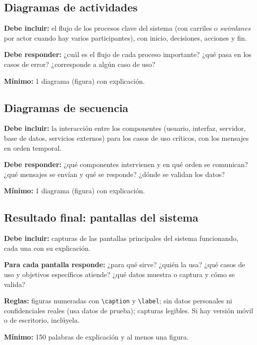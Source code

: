 

\subsection{Diagramas de actividades} \label{sec:diagramas_actividades} %

\begin{guia}
\textbf{Debe incluir:} el flujo de los procesos clave del sistema (con carriles o \emph{swimlanes} por actor cuando hay
varios participantes), con inicio, decisiones, acciones y fin.

\textbf{Debe responder:} ¿cuál es el flujo de cada proceso importante? ¿qué pasa en los casos de error? ¿corresponde a
algún caso de uso?

\textbf{Mínimo:} 1 diagrama (figura) con explicación.
\end{guia}



\subsection{Diagramas de secuencia} \label{sec:diagramas_secuencia} %

\begin{guia}
\textbf{Debe incluir:} la interacción entre los componentes (usuario, interfaz, servidor, base de datos, servicios
externos) para los casos de uso críticos, con los mensajes en orden temporal.

\textbf{Debe responder:} ¿qué componentes intervienen y en qué orden se comunican? ¿qué mensajes se envían y qué se
responde? ¿dónde se validan los datos?

\textbf{Mínimo:} 1 diagrama (figura) con explicación.
\end{guia}



\subsection{Resultado final: pantallas del sistema} \label{sec:pantallas} %

\begin{guia}
\textbf{Debe incluir:} capturas de las pantallas principales del sistema funcionando, cada una con su explicación.

\textbf{Para cada pantalla responde:} ¿para qué sirve? ¿quién la usa? ¿qué casos de uso y objetivos específicos
atiende? ¿qué datos muestra o captura y cómo se valida?

\textbf{Reglas:} figuras numeradas con \verb|\caption| y \verb|\label|; sin datos personales ni confidenciales reales
(usa datos de prueba); capturas legibles. Si hay versión móvil o de escritorio, inclúyela.

\textbf{Mínimo:} 150 palabras de explicación y al menos una figura.
\end{guia}

